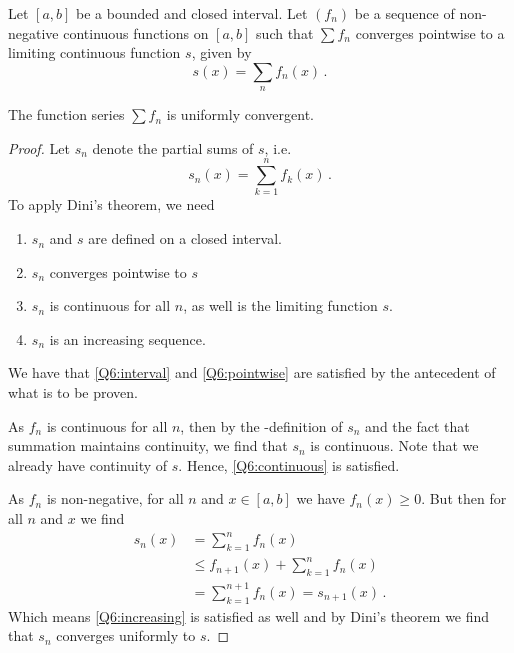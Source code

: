 \documentclass[week=11]{homework}
\begin{document}
\begin{questions}
	    
	    \question
	    Let $[a,b]$ be a bounded and closed interval. Let $(f_n)$ be a sequence of non-negative continuous functions on $[a,b]$ such that $\sum f_n$ converges pointwise to a limiting continuous function $s$, given by
	    \[
		    s(x) = \sum_n f_n(x)\,.
	    \]
	    \begin{toprove}
	    	The function series $\sum f_n$ is uniformly convergent.
	    \end{toprove}
	    \begin{proof}
	    	Let $s_n$ denote the partial sums of $s$, i.e.
	    	\[
	    	s_n(x) = \sum_{k=1}^{n} f_k(x)\,.
	    	\]
	    	To apply Dini's theorem, we need
	    	\begin{enumerate}
	    		\item \label{Q6:interval} $s_n$ and $s$ are defined on a closed interval.
	    		\item \label{Q6:pointwise} $s_n$ converges pointwise to $s$
	    		\item \label{Q6:continuous} $s_n$ is continuous for all $n$, as well is the limiting function $s$.
	    		\item \label{Q6:increasing} $s_n$ is an increasing sequence.
	    	\end{enumerate}
	    	We have that \ref{Q6:interval} and \ref{Q6:pointwise} are satisfied by the antecedent of what is to be proven.
	    	
	    	As $f_n$ is continuous for all $n$, then by the -definition of $s_n$ and the fact that summation maintains continuity, we find that $s_n$ is continuous. Note that we already have continuity of $s$. Hence, \ref{Q6:continuous} is satisfied.
	    	
	    	As $f_n$ is non-negative, for all $n$ and $x \in [a,b]$ we have $f_n(x) \geq 0$. But then for all $n$ and $x$ we find
	    	\begin{align*}
	    	s_n(x) &= \sum_{k=1}^{n} f_n(x) \\
	    	&\leq f_{n+1}(x) + \sum_{k=1}^{n} f_n(x) \\
	    	&= \sum_{k=1}^{n+1} f_n(x) = s_{n+1}(x)\,.
	    	\end{align*}
	    	Which means \ref{Q6:increasing} is satisfied as well and by Dini's theorem we find that $s_n$ converges uniformly to $s$.
	    \end{proof}
     \end{questions}
\end{document}
